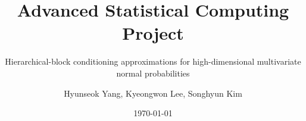 \documentclass{scrartcl}
\begin{document}
\title{Advanced Statistical Computing Project}
\subtitle{Hierarchical-block conditioning approximations for high-dimensional multivariate normal probabilities}
\author{Hyunseok Yang, Kyeongwon Lee, Songhyun Kim}
\date{\today}
\maketitle










\end{document}
